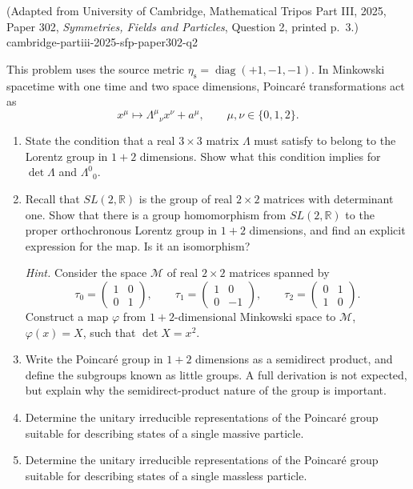 \begin{enumerate}
  {(Adapted from University of Cambridge, Mathematical Tripos Part III, 2025, Paper 302, \emph{Symmetries, Fields and Particles}, Question 2, printed p.~3.)}
  {cambridge-partiii-2025-sfp-paper302-q2}

This problem uses the source metric
\(\eta_{\mathrm s}=\operatorname{diag}(+1,-1,-1)\).  In Minkowski
spacetime with one time and two space dimensions, Poincar\'e
transformations act as
\[
 x^\mu\longmapsto\Lambda^\mu{}_{\nu}x^\nu+a^\mu,
 \qquad \mu,\nu\in\{0,1,2\}.
\]
\begin{enumerate}
\item[(a)] State the condition that a real \(3\times3\) matrix \(\Lambda\)
must satisfy to belong to the Lorentz group in \(1+2\) dimensions.  Show
what this condition implies for \(\det\Lambda\) and
\(\Lambda^0{}_{0}\).
\item[(b)] Recall that \(SL(2,\mathbb R)\) is the group of real
\(2\times2\) matrices with determinant one.  Show that there is a group
homomorphism from \(SL(2,\mathbb R)\) to the proper orthochronous Lorentz
group in \(1+2\) dimensions, and find an explicit expression for the
map.  Is it an isomorphism?

\emph{Hint.} Consider the space \(\mathcal M\) of real \(2\times2\)
matrices spanned by
\[
 \tau_0=\begin{pmatrix}1&0\\0&1\end{pmatrix},\qquad
 \tau_1=\begin{pmatrix}1&0\\0&-1\end{pmatrix},\qquad
 \tau_2=\begin{pmatrix}0&1\\1&0\end{pmatrix}.
\]
Construct a map \(\varphi\) from \(1+2\)-dimensional Minkowski space to
\(\mathcal M\), \(\varphi(x)=X\), such that \(\det X=x^2\).
\item[(c)] Write the Poincar\'e group in \(1+2\) dimensions as a
semidirect product, and define the subgroups known as little groups.  A
full derivation is not expected, but explain why the semidirect-product
nature of the group is important.
\item[(d)] Determine the unitary irreducible representations of the
Poincar\'e group suitable for describing states of a single massive
particle.
\item[(e)] Determine the unitary irreducible representations of the
Poincar\'e group suitable for describing states of a single massless
particle.
\end{enumerate}


\end{enumerate}
